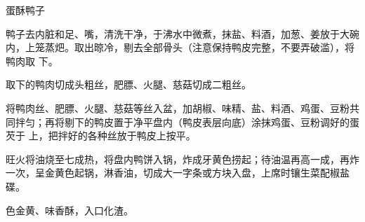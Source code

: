 \begin{recipe}{蛋酥鸭子}

\ingredients


\preparation

\step 鸭子去内脏和足、嘴，清洗干净，于沸水中微煮，抹盐、料酒，加葱、姜放于大碗
内，上笼蒸𤆵。取出晾冷，剔去全部骨头（注意保持鸭皮完整，不要弄破滥），将鸭肉取
下。

\step 取下的鸭肉切成头粗丝，肥膘、火腿、慈菇切成二粗丝。

\step 将鸭肉丝、肥膘、火腿、慈菇等丝入盆，加胡椒、味精、盐、料酒、鸡蛋、豆粉共
同拌匀；再将剔下的鸭皮置于净平盘内（鸭皮表层向底）涂抹鸡蛋、豆粉调好的蛋芡于
上，把拌好的各种丝放于鸭皮上按平。

\step 旺火将油烧至七成热，将盘内鸭饼入锅，炸成牙黄色捞起；待油温再高一成，再炸
一次，呈金黄色起锅，淋香油，切成大一字条或方块入盘，上席时镶生菜配椒盐碟。

\features

色金黄、味香酥，入口化渣。

\end{recipe}

